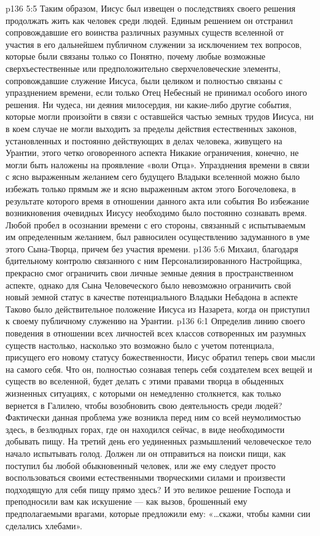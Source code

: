 \vs p136 5:5 \pc Таким образом, Иисус был извещен о последствиях своего решения продолжать жить как человек среди людей. Единым решением он отстранил сопровождавшие его воинства различных разумных существ вселенной от участия в его дальнейшем публичном служении за исключением тех вопросов, которые были связаны только со  Понятно, почему любые возможные сверхъестественные или предположительно сверхчеловеческие элементы, сопровождавшие служение Иисуса, были целиком и полностью связаны с упразднением времени, если только Отец Небесный не принимал особого иного решения. Ни чудеса, ни деяния милосердия, ни какие\hyp{}либо другие события, которые могли произойти в связи с оставшейся частью земных трудов Иисуса, ни в коем случае не могли выходить за пределы действия естественных законов, установленных и постоянно действующих в делах человека, живущего на Урантии,  этого четко оговоренного аспекта  Никакие ограничения, конечно, не могли быть наложены на проявление «воли Отца». Упразднения времени в связи с ясно выраженным желанием сего будущего Владыки вселенной можно было избежать только прямым же и ясно выраженным актом  этого Богочеловека, в результате которого время в отношении данного акта или события  Во избежание возникновения очевидных  Иисусу необходимо было постоянно сознавать время. Любой пробел в осознании времени с его стороны, связанный с испытываемым им определенным желанием, был равносилен осуществлению задуманного в уме этого Сына\hyp{}Творца, причем без участия времени.
\vs p136 5:6 Михаил, благодаря бдительному контролю связанного с ним Персонализированного Настройщика, прекрасно смог ограничить свои личные земные деяния в пространственном аспекте, однако для Сына Человеческого было невозможно ограничить свой новый земной статус в качестве потенциального Владыки Небадона в аспекте  Таково было действительное положение Иисуса из Назарета, когда он приступил к своему публичному служению на Урантии.
\vs p136 6:1 Определив линию своего поведения в отношении всех личностей всех классов сотворенных им разумных существ настолько, насколько это возможно было с учетом потенциала, присущего его новому статусу божественности, Иисус обратил теперь свои мысли на самого себя. Что он, полностью сознавая теперь себя создателем всех вещей и существ во вселенной, будет делать с этими правами творца в обыденных жизненных ситуациях, с которыми он немедленно столкнется, как только вернется в Галилею, чтобы возобновить свою деятельность среди людей? Фактически данная проблема уже возникла перед ним со всей неумолимостью здесь, в безлюдных горах, где он находился сейчас, в виде необходимости добывать пищу. На третий день его уединенных размышлений человеческое тело начало испытывать голод. Должен ли он отправиться на поиски пищи, как поступил бы любой обыкновенный человек, или же ему следует просто воспользоваться своими естественными творческими силами и произвести подходящую для себя пищу прямо здесь? И это великое решение Господа и преподносили вам как искушение --- как вызов, брошенный ему предполагаемыми врагами, которые предложили ему: «\ldots скажи, чтобы камни сии сделались хлебами».
